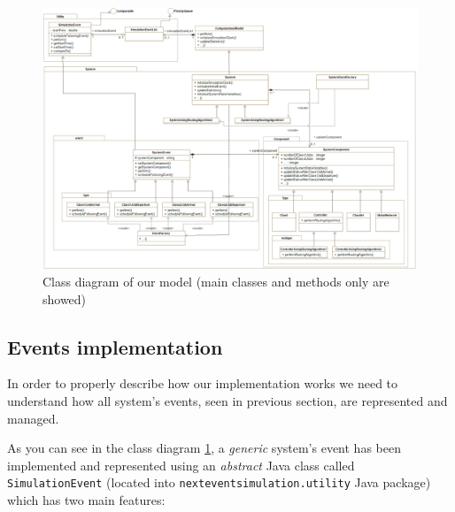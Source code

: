 \documentclass[10pt,a4paper]{article}
\begin{document}
\begin{figure}[H]
\includegraphics[width=\textwidth]{ClassDiagram}
\centering
\caption{Class diagram of our model (main classes and methods only are showed)}

\label{fig:ClassDiagram}

\end{figure}


\subsection{Events implementation}

In order to properly describe how our implementation works we need to understand how all system's events, seen in previous section, are represented and managed.

As you can see in the class diagram \ref{fig:ClassDiagram}, a \textit{generic} system's event has been implemented and represented using an \textit{abstract} Java class called \texttt{SimulationEvent} (located into \texttt{nexteventsimulation.\-utility} Java package) which has two main features:
\end{document}
